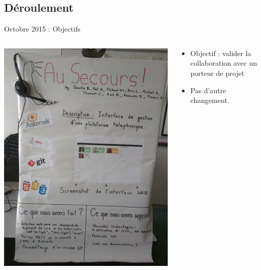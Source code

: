 \documentclass{beamer}
\begin{document}
\subsection{Déroulement}
\begin{frame}{Octobre 2015 : Objectifs}
  \begin{columns}
    \begin{column}{0.5\textwidth}
      \begin{center}
        \includegraphics[width=\textwidth]{includes/201510_salon.jpg}      
      \end{center}
    \end{column}
    \begin{column}{0.5\textwidth}
      \begin{itemize}
        \item Objectif : valider la collaboration avec un porteur de projet
        \item Pas d'autre changement.
      \end{itemize}
    \end{column}
  \end{columns}
\end{frame}
\end{document}
